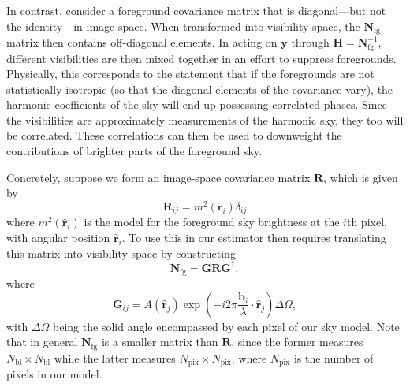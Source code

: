 \documentclass[twolcolumn,apj,iop,numberedappendix]{emulateapj}
\newcommand{\y}{\mathbf{y}}
\newcommand{\Hmat}{\mathbf{H}}
\newcommand{\Nfg}{\mathbf{N}_{\textrm{fg}}}
\newcommand{\R}{\mathbf{R}}
\newcommand{\rhat}{\hat{\mathbf{r}}}
\begin{document}
In contrast, consider a foreground covariance matrix that is diagonal---but not the identity---in image space. When transformed into visibility space, the $\Nfg$ matrix then contains off-diagonal elements. In acting on $\y$ through $\Hmat = \Nfg^{-1}$, different visibilities are then mixed together in an effort to suppress foregrounds. Physically, this corresponds to the statement that if the foregrounds are not statistically isotropic (so that the diagonal elements of the covariance vary), the harmonic coefficients of the sky will end up possessing correlated phases. Since the visibilities are approximately measurements of the harmonic sky, they too will be correlated. These correlations can then be used to downweight the contributions of brighter parts of the foreground sky.

Concretely, suppose we form an image-space covariance matrix $\R$, which is given by
\begin{equation}
\label{eq:Rmatrix}
\R_{ij} = m^2(\rhat_i) \delta_{ij}
\end{equation}
where $m^2(\rhat_i)$ is the model for the foreground sky brightness at the $i$th pixel, with angular position $\rhat_i$. To use this in our estimator then requires translating this matrix into visibility space by constructing
\begin{equation}
\label{eq:GRG}
\Nfg = \mathbf{G} \R \mathbf{G}^\dagger,
\end{equation}
where
\begin{equation}
\mathbf{G}_{ij} = A(\rhat_j)\exp\left(-i2\pi \frac{\mathbf{b_\textit{i}}}{\lambda} \cdot \boldsymbol \rhat_j\right) \Delta \Omega,
\end{equation}
with $\Delta \Omega$ being the solid angle encompassed by each pixel of our sky model. Note that in general $\Nfg$ is a smaller matrix than $\R$, since the former measures $N_\textrm{bl} \times N_\textrm{bl}$ while the latter measures $N_\textrm{pix} \times N_\textrm{pix}$, where $N_\textrm{pix}$ is the number of pixels in our model.
\end{document}
